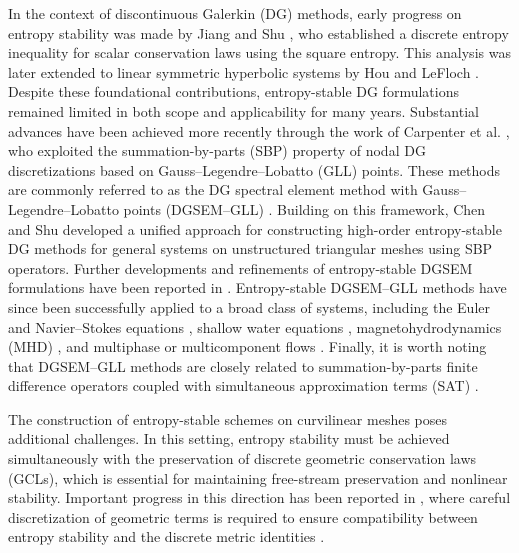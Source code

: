 \documentclass[fleqn,11pt]{amsart}
\begin{document}
In the context of discontinuous Galerkin (DG) methods, early progress on entropy stability was made by Jiang and Shu \cite{jiang1994cell}, who established a discrete entropy inequality for scalar conservation laws using the square entropy. This analysis was later extended to linear symmetric hyperbolic systems by Hou and LeFloch \cite{hou2007solutions}. Despite these foundational contributions, entropy-stable DG formulations remained limited in both scope and applicability for many years.
Substantial advances have been achieved more recently through the work of Carpenter et al. \cite{Carpenter14,fisher2013high}, who exploited the summation-by-parts (SBP) property of nodal DG discretizations based on Gauss–Legendre–Lobatto (GLL) points. These methods are commonly referred to as the DG spectral element method with Gauss–Legendre–Lobatto points (DGSEM–GLL) \cite{del2018simultaneous,zhang2023discontinuous}. Building on this framework, Chen and Shu \cite{chen2017entropy,chen2020review} developed a unified approach for constructing high-order entropy-stable DG methods for general systems on unstructured triangular meshes using SBP operators.
Further developments and refinements of entropy-stable DGSEM formulations have been reported in \cite{crean2018entropy,chan2018discretely,chan2019efficient}. Entropy-stable DGSEM–GLL methods have since been successfully applied to a broad class of systems, including the Euler and Navier–Stokes equations \cite{crean2018entropy}, shallow water equations \cite{gassner2016well,wintermeyer2017entropy}, magnetohydrodynamics (MHD) \cite{bohm2020entropy,liu2025entropy}, and multiphase or multicomponent flows \cite{renac2019entropy}. Finally, it is worth noting that DGSEM–GLL methods are closely related to summation-by-parts finite difference operators coupled with simultaneous approximation terms (SAT) \cite{gassner2016split,gassner2013skew}.

The construction of entropy-stable schemes on curvilinear meshes poses additional challenges. In this setting, entropy stability must be achieved simultaneously with the
preservation of discrete geometric conservation laws (GCLs), which is essential for maintaining free-stream preservation and nonlinear stability. Important progress in this direction has been reported in
\cite{fisher2012high,carpenter2016entropy,crean2018entropy,chan2019discretely,bohm2020entropy}, where careful discretization of geometric terms is required to ensure
compatibility between entropy stability and the discrete metric identities \cite{Kopriva2006}.
\end{document}
